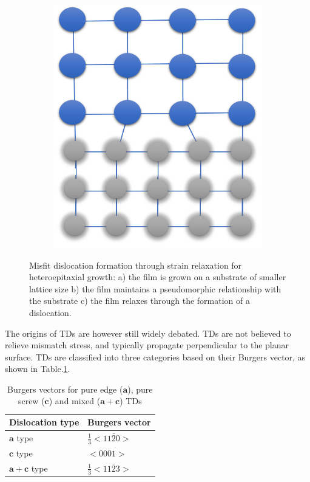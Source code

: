 \begin{figure}
\begin{subfigure}[b]{0.3\textwidth}
	\end{subfigure}%
	\hspace*{0.5cm}
	\begin{subfigure}[b]{0.3\textwidth}
		\centering
		\includegraphics[width=.85\linewidth]{Figs/Ch1/MDc}
		\caption{}
	\end{subfigure}%

	\caption{Misfit dislocation formation through strain relaxation for heteroepitaxial growth: a) the film is grown on a substrate of smaller lattice size b) the film maintains a pseudomorphic relationship with the substrate c) the film relaxes through the formation of a dislocation.}
\end{figure}
\FloatBarrier

The origins of TDs are however still widely debated. TDs are not believed to relieve mismatch stress, and typically propagate perpendicular to the planar surface. TDs are classified into three categories based on their Burgers vector, as shown in Table.\ref{tab1.4}.

\begin{table}[h]
	\centering
	\begin{tabular}{p{4cm} p{4cm}   }
		\centering
		\textbf{Dislocation type}& \textbf{Burgers vector} \\
		\hline
		$\mathbf{a}$ type & $\frac{1}{3}<11\bar{2}0>$ \\
		$\mathbf{c}$ type& $<0001>$ \\
		$\mathbf{a+c}$ type & $\frac{1}{3}<11\bar{2}3>$ \\
		\hline
		
	\end{tabular}
	\caption{Burgers vectors for pure edge ($\mathbf{a}$), pure screw ($\mathbf{c}$) and mixed ($\mathbf{a+c}$)  TDs}
	\label{tab1.4}
\end{table}
\FloatBarrier


